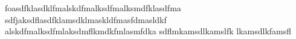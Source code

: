 foasdfklasdklfmalskdfmalksdfmalksmdfklasdfma
sdfjaksdflasdfklamsdklmaskldfmasfdmasldkf
alskdfmalksdfmlaksdmflkmdkfmlasmfdka
sdflmkamsdlkamslfk
lkamsdlkfamsfl